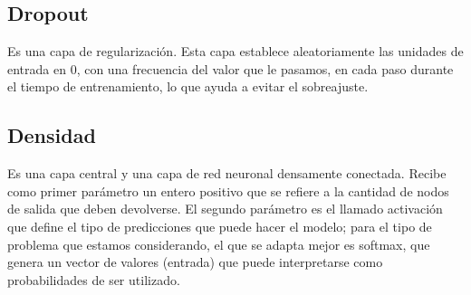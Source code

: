 \documentclass[12pt, a4paper, titlepage]{report}
\begin{document}
\subsection{Dropout}
Es una capa de regularización. Esta capa establece aleatoriamente las unidades de entrada en 0, con una frecuencia del valor que le pasamos, en cada paso durante el tiempo de entrenamiento, lo que ayuda a evitar el sobreajuste.
\begin{center}
	
\end{center}
\subsection{Densidad}
Es una capa central y una capa de red neuronal densamente conectada. Recibe como primer parámetro un entero positivo que se refiere a la cantidad de nodos de salida que deben devolverse. El segundo parámetro es el llamado activación que define el tipo de predicciones que puede hacer el modelo; para el tipo de problema que estamos considerando, el que se adapta mejor es softmax, que genera un vector de valores (entrada) que puede interpretarse como probabilidades de ser utilizado.
\begin{center}
	
\end{center}
\end{document}
